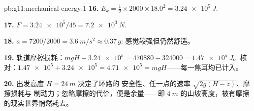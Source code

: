 \begin{solution}{pb:g11:mechanical-energy:1}
\textbf{16.} $E_k = \tfrac12 \times 2000 \times 18.0^2 =
\qty{3.24e5}{J}$.

\textbf{17.} $F = \num{3.24e5}/45 = \qty{7.2e3}{N}$.

\textbf{18.} $a = 7200/2000 = \qty{3.6}{m/s^2} \approx 0.37\,g$:
感觉较强但仍然舒适。

\textbf{19.} 轨道摩擦损耗：$mgH - \num{3.24e5} = \num{470880} -
\num{324000} = \qty{1.47e5}{J}$。核对：$\num{1.47e5} + \num{3.24e5} =
\num{4.71e5} = mgH$——每一焦耳均已计入。

\textbf{20.} 出发高度 $H = \qty{24}{m}$ 决定了环路的
安全性、任一点的速率 $\sqrt{2g(H - z)}$、摩擦损耗与
制动力；忽略摩擦的代价，便是余量——即 $\qty{4}{m}$
的山坡高度，被有摩擦的现实世界悄然耗去。
\end{solution}
